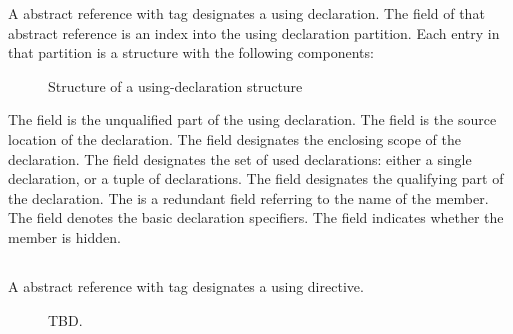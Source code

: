 A  abstract reference with tag  designates a using declaration.
The  field of that abstract reference is an index into the using declaration partition.
Each entry in that partition is a structure with the following components:
%
\begin{figure}[H]
	\centering
	\caption{Structure of a using-declaration structure}
	\label{fig:ifc-using-declaration-structure}
\end{figure}
%

The  field is the unqualified part of the using declaration.
The  field is the source location of the declaration.
The  field designates the enclosing scope of the declaration.
The  field designates the set of used declarations: either a single declaration, or a tuple of declarations.
The  field designates the qualifying part of the declaration.
The  is a redundant field referring to the name of the member.
The  field denotes the basic declaration specifiers.
The  field indicates whether the member is hidden.




\subsection{}
\label{sec:ifc:DeclSort:UsingDirective}

A  abstract reference with tag  designates a using directive.


%
\begin{figure}[H]
	\centering
	TBD.
\end{figure}
%

